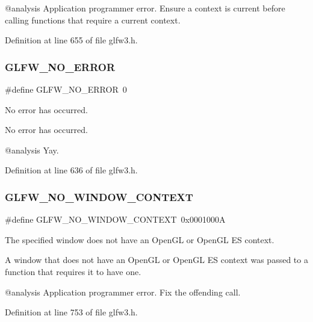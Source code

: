 @analysis Application programmer error. Ensure a context is current before calling functions that require a current context. 

Definition at line 655 of file glfw3.\+h.

\mbox{\label{group__errors_gafa30deee5db4d69c4c93d116ed87dbf4}} 
\subsubsection{\texorpdfstring{GLFW\_NO\_ERROR}{GLFW\_NO\_ERROR}}
{\footnotesize\ttfamily \#define G\+L\+F\+W\+\_\+\+N\+O\+\_\+\+E\+R\+R\+OR~0}



No error has occurred. 

No error has occurred.

@analysis Yay. 

Definition at line 636 of file glfw3.\+h.

\mbox{\label{group__errors_gacff24d2757da752ae4c80bf452356487}} 
\subsubsection{\texorpdfstring{GLFW\_NO\_WINDOW\_CONTEXT}{GLFW\_NO\_WINDOW\_CONTEXT}}
{\footnotesize\ttfamily \#define G\+L\+F\+W\+\_\+\+N\+O\+\_\+\+W\+I\+N\+D\+O\+W\+\_\+\+C\+O\+N\+T\+E\+XT~0x0001000A}



The specified window does not have an Open\+GL or Open\+GL ES context. 

A window that does not have an Open\+GL or Open\+GL ES context was passed to a function that requires it to have one.

@analysis Application programmer error. Fix the offending call. 

Definition at line 753 of file glfw3.\+h.

\mbox{\label{group__errors_ga2374ee02c177f12e1fa76ff3ed15e14a}} 
